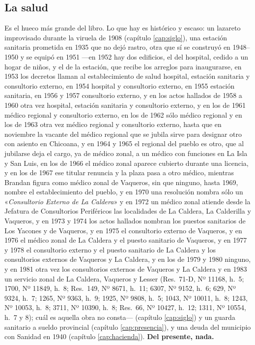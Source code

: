 \subsection*{La salud}

Es el hueco más grande del libro. Lo que hay es histórico y escaso: un lazareto improvisado
durante la viruela de 1908 (capítulo \ref{cap:siglo}), una estación sanitaria prometida en 1935
que no dejó rastro, otra que sí se construyó en 1948--1950 y se equipó en 1951 ---en 1952 hay dos edificios, el del hospital, cedido a un hogar de niños, y el de la estación, que recibe los arreglos para inaugurarse, en 1953 los decretos llaman al establecimiento de salud hospital, estación sanitaria y consultorio externo, en 1954 hospital y consultorio externo, en 1955 estación sanitaria, en 1956 y 1957 consultorio externo, y en los actos hallados de 1958 a 1960 otra vez hospital, estación sanitaria y consultorio externo, y en los de 1961 médico regional y consultorio externo, en los de 1962 sólo médico regional y en los de 1963 otra vez médico regional y consultorio externo, hasta que en noviembre la vacante del médico regional que se jubila sirve para designar otro con asiento en Chicoana, y en 1964 y 1965 el regional del pueblo es otro, que al jubilarse deja el cargo, ya de médico zonal, a un médico con funciones en La Isla y San Luis, en los de 1966 el médico zonal aparece cubierto durante una licencia, y en los de 1967 ese titular renuncia y la plaza pasa a otro médico, mientras Brandan figura como médico zonal de Vaqueros, sin que ninguno, hasta 1969, nombre el establecimiento del pueblo, y en 1970 una resolución nombra sólo un «\textit{Consultorio Externo de La Caldera}» y en 1972 un médico zonal atiende desde la Jefatura de Consultorios Periféricos las localidades de La Caldera, La Calderilla y Vaqueros, y en 1973 y 1974 los actos hallados nombran los puestos sanitarios de Los Yacones y de Vaqueros, y en 1975 el consultorio externo de Vaqueros, y en 1976 el médico zonal de La Caldera y el puesto sanitario de Vaqueros, y en 1977 y 1978 el consultorio externo y el puesto sanitario de La Caldera y los consultorios externos de Vaqueros y La Caldera, y en los de 1979 y 1980 ninguno, y en 1981 otra vez los consultorios externos de Vaqueros y La Caldera y en 1983 un servicio zonal de La Caldera, Vaqueros y Lesser (Res.\ 71-D, Nº 11168, h.\ 5; 1700, Nº 11849, h.\ 8; Res.\ 149, Nº 8671, h.\ 11; 6307, Nº 9152, h.\ 6; 629, Nº 9324, h.\ 7; 1265, Nº 9363, h.\ 9; 1925, Nº 9808, h.\ 5; 1043, Nº 10011, h.\ 8; 1243, Nº 10053, h.\ 8; 3711, Nº 10390, h.\ 8; Res.\ 66, Nº 10427, h.\ 12; 1311, Nº 10554, h.\ 7 y 8); cuál es aquella obra no consta--- (capítulo \ref{cap:siglo}) y un guarda sanitario a sueldo provincial (capítulo \ref{cap:presencia}), y
una deuda del municipio con Sanidad en 1940 (capítulo \ref{cap:hacienda}). \textbf{Del presente,
nada.}

